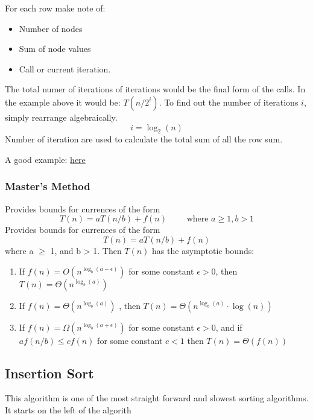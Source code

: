 For each row make note of: 
\begin{itemize}
    \item Number of nodes
    \item Sum of node values
    \item Call or current iteration. 
\end{itemize}

The total numer of iterations of iterations would be the final form of the calls. In the example above it would be: $T(n/2^{i})$. To find out the number of iterations $i$, simply rearrange algebraically. 
$$ i = \log_2(n) $$
Number of iteration are used to calculate the total sum of all the row sum. 

\noindent A good example:  \href{https://www.youtube.com/watch?v=sLNPd_nPGIc}{here}
\vspace{5mm}

\subsubsection{Master's Method}
Provides bounds for currences of the form\\
\begin{equation}
    T(n) = aT(n/b)+ f(n) \qquad \text{  where  } a \geq 1,  b > 1
\end{equation}
Provides bounds for currences of the form
\begin{equation}
    T(n) = aT(n/b)+ f(n)
\end{equation}
where a $\geq$ 1, and b > 1. Then $T(n)$ has the asymptotic bounds:
\begin{enumerate}
    \item If $f(n) = O(n^{\log_b(a-\epsilon)})$ for some constant $\epsilon > 0$, then $T(n) = \Theta(n^{\log_b(a)})$ 
    \item If $f(n) = \Theta(n^{\log_b(a)})$ , then $T(n) = \Theta(n^{\log_b(a)}\cdot \log(n))$
    \item If $f(n) = \Omega(n^{\log_b(a+\epsilon)})$ for some constant $\epsilon > 0$, and if $af(n/b)\leq cf(n)$ for some constant $c<1$ then $T(n) = \Theta(f(n))$
\end{enumerate}

\subsection{Insertion Sort}
This algorithm is one of the most straight forward and slowest sorting algorithms.
It starts on the left of the algorith